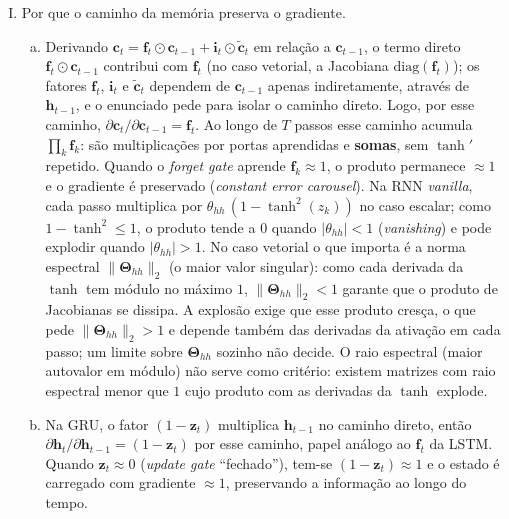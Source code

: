 \documentclass{dlproblemset}
\begin{document}
\begin{enumerate}[I)]
\item Por que o caminho da memória preserva o gradiente.
\begin{enumerate}[(a)]
    \item Derivando $\mathbf{c}_t = \mathbf{f}_t \odot \mathbf{c}_{t-1} + \mathbf{i}_t \odot \tilde{\mathbf{c}}_t$ em relação a $\mathbf{c}_{t-1}$,
    o termo direto $\mathbf{f}_t \odot \mathbf{c}_{t-1}$ contribui com $\mathbf{f}_t$ (no caso vetorial, a Jacobiana
    $\mathrm{diag}(\mathbf{f}_t)$); os fatores $\mathbf{f}_t$, $\mathbf{i}_t$ e
    $\tilde{\mathbf{c}}_t$ dependem de $\mathbf{c}_{t-1}$ apenas indiretamente, através de $\mathbf{h}_{t-1}$, e o enunciado
    pede para isolar o caminho direto. Logo, por esse caminho,
    $\partial \mathbf{c}_t / \partial \mathbf{c}_{t-1} = \mathbf{f}_t$. Ao longo de $T$ passos esse caminho acumula
    $\prod_k \mathbf{f}_k$: são multiplicações por portas aprendidas e \textbf{somas}, sem $\tanh'$
    repetido. Quando o \textit{forget gate} aprende $\mathbf{f}_k \approx 1$, o produto permanece
    $\approx 1$ e o gradiente é preservado (\textit{constant error carousel}). Na RNN
    \textit{vanilla}, cada passo multiplica por $\theta_{hh}\,(1 - \tanh^2(z_k))$ no caso escalar; como
    $1 - \tanh^2 \le 1$, o produto tende a $0$ quando $|\theta_{hh}| < 1$ (\textit{vanishing}) e pode
    explodir quando $|\theta_{hh}| > 1$. No caso vetorial o que importa é a norma espectral
    $\|\mathbf{\Theta}_{hh}\|_2$ (o maior valor singular): como cada derivada da $\tanh$ tem módulo no
    máximo $1$, $\|\mathbf{\Theta}_{hh}\|_2 < 1$ garante que o produto de Jacobianas se dissipa. A explosão
    exige que esse produto cresça, o que pede $\|\mathbf{\Theta}_{hh}\|_2 > 1$ e depende também das
    derivadas da ativação em cada passo; um limite sobre $\mathbf{\Theta}_{hh}$ sozinho não decide. O raio
    espectral (maior autovalor em módulo) não serve como critério: existem matrizes com raio espectral
    menor que $1$ cujo produto com as derivadas da $\tanh$ explode.
    \item Na GRU, o fator $(1 - \mathbf{z}_t)$ multiplica $\mathbf{h}_{t-1}$ no caminho direto, então
    $\partial \mathbf{h}_t / \partial \mathbf{h}_{t-1} = (1 - \mathbf{z}_t)$ por esse caminho, papel análogo ao $\mathbf{f}_t$ da
    LSTM. Quando $\mathbf{z}_t \approx 0$ (\textit{update gate} ``fechado''), tem-se $(1 - \mathbf{z}_t) \approx 1$
    e o estado é carregado com gradiente $\approx 1$, preservando a informação ao longo do tempo.
\end{enumerate}


\end{enumerate}
\end{document}
